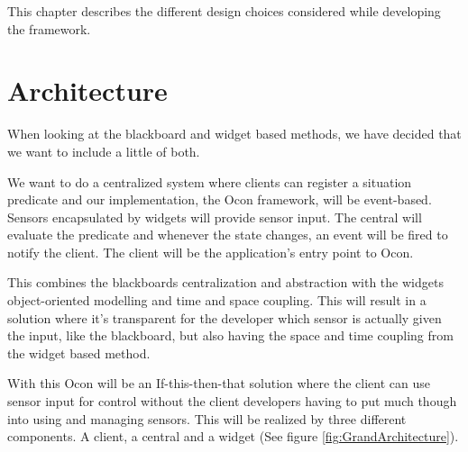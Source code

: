 \documentclass[../report.tex]{subfiles}
\begin{document}
\graphicspath{{img/}{../img/}}
This chapter describes the different design choices considered while developing the framework.

%
%

\section{Architecture}
When looking at the blackboard and widget based methods, we have decided that we want to include a little of both.

We want to do a centralized system where clients can register a situation predicate and our implementation, the Ocon framework, will be event-based. Sensors encapsulated by widgets will provide sensor input. The central will evaluate the predicate and whenever the state changes, an event will be fired to notify the client. The client will be the application's entry point to Ocon.

This combines the blackboards centralization and abstraction with the widgets object-oriented modelling and time and space coupling. This will result in a solution where it's transparent for the developer which sensor is actually given the input, like the blackboard, but also having the space and time coupling from the widget based method.

With this Ocon will be an If-this-then-that solution where the client can use sensor input for control without the client developers having to put much though into using and managing sensors. This will be realized by three different components. A client, a central and a widget (See figure \ref{fig:GrandArchitecture}).
\end{document}
